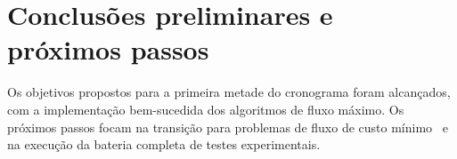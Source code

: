 \documentclass[12pt,a4paper]{article}
\begin{document}
\section{Conclusões preliminares e próximos passos}
Os objetivos propostos para a primeira metade do cronograma foram alcançados, com a implementação bem-sucedida dos algoritmos de fluxo máximo. Os próximos passos focam na transição para problemas de fluxo de custo mínimo~\cite{ahuja1993network} e na execução da bateria completa de testes experimentais.

\newpage


\end{document}
